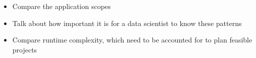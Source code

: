 \begin{itemize}
	\item Compare the application scopes
	\item Talk about how important it is for a data scientist to know these patterns
	\item Compare runtime complexity, which need to be accounted for to plan feasible projects
\end{itemize}
